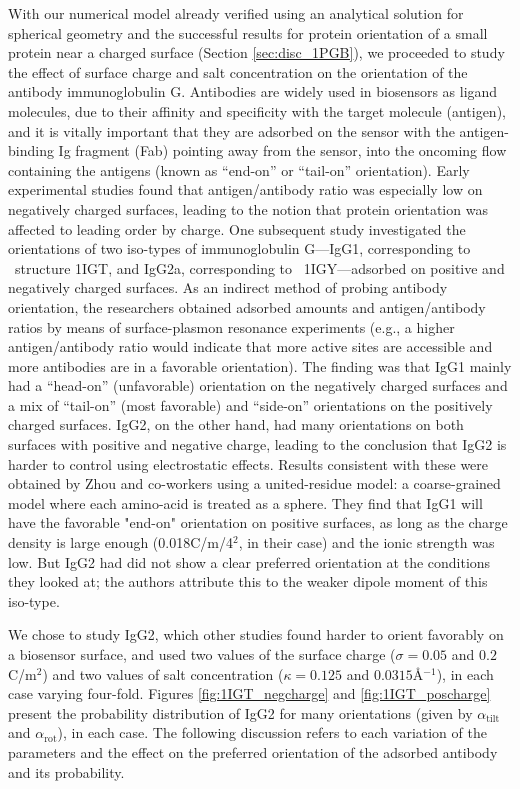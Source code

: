  With our numerical model already verified using an analytical solution for spherical geometry\cite{CooperBarba2015a} and the successful results for protein orientation of a small protein near a charged surface (Section \ref{sec:disc_1PGB}), we proceeded to study the effect of surface charge and salt concentration on the orientation of the antibody immunoglobulin G. Antibodies are widely used in biosensors as ligand molecules, due to their affinity and specificity with the target molecule (antigen), and it is vitally important that they are adsorbed on the sensor with the antigen-binding Ig fragment (Fab) pointing away from the sensor, into the oncoming flow containing the antigens (known as ``end-on'' or ``tail-on'' orientation).
Early experimental studies found that antigen/antibody ratio was especially low on negatively charged surfaces,\cite{BuijsETal1997} leading to the notion that protein orientation was affected to leading order by charge. 
One subsequent study\cite{ChenLiuZhouJiang2003} investigated the orientations of two iso-types of immunoglobulin G---IgG1, corresponding to \pdb\ structure {\small 1IGT}, and IgG2a, corresponding to \pdb\ {\small 1IGY}---adsorbed on positive and negatively charged surfaces. 
As an indirect method of probing antibody orientation, the researchers obtained adsorbed amounts and antigen/antibody ratios by means of surface-plasmon resonance experiments (e.g., a higher antigen/antibody ratio would indicate that more active sites are accessible and more antibodies are in a favorable orientation). 
The finding was that IgG1 mainly had a ``head-on'' (unfavorable) orientation on the negatively charged surfaces and a mix of ``tail-on'' (most favorable) and ``side-on'' orientations on the positively charged surfaces. 
IgG2, on the other hand, had many orientations on both surfaces with positive and negative charge, leading to the conclusion that IgG2 is harder to control using electrostatic effects.
Results consistent with these were obtained by Zhou and co-workers\cite{ZhouChenJiang2003} using a united-residue model: a coarse-grained model where each amino-acid is treated as a sphere. They find that IgG1 will have the favorable "end-on" orientation on positive surfaces, as long as the charge density is large enough (0.018C/m/4$^{2}$, in their case) and the ionic strength was low. But IgG2 had did not show a clear preferred orientation at the conditions they looked at; the authors attribute this to the weaker dipole moment of this iso-type.
 
We chose to study IgG2, which other studies found harder to orient favorably on a biosensor surface, and used two values of the surface charge ($\sigma=0.05$ and $0.2$C/m$^{2}$) and two values of salt concentration ($\kappa=0.125$ and $0.0315$\AA$^{-1}$), in each case varying four-fold.
 Figures \ref{fig:1IGT_negcharge} and \ref{fig:1IGT_poscharge} present the probability distribution of IgG2 for many orientations (given by $\alpha_\text{tilt}$ and $\alpha_\text{rot}$), in each case.
 The following discussion refers to each variation of the parameters and the effect on the preferred orientation of the adsorbed antibody and its probability.

